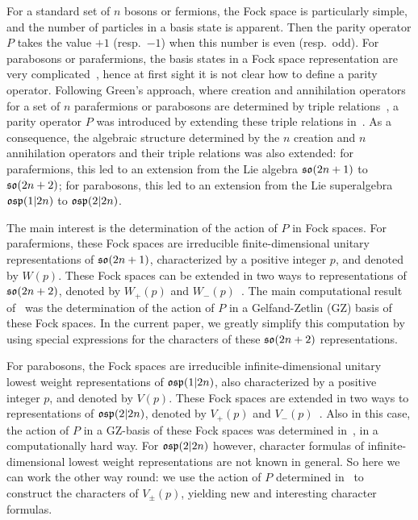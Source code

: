 \documentclass{SciPost}
\begin{document}
For a standard set of $n$ bosons or fermions, the Fock space is particularly simple, and the number of particles in a basis state is apparent. 
Then the parity operator $P$ takes the value $+1$ (resp.\ $-1$) when this number is even (resp.\ odd).
For parabosons or parafermions, the basis states in a Fock space representation are very complicated~\cite{parafermion,paraboson}, hence at first sight it is not clear how to define a parity operator.
Following Green's approach, where creation and annihilation operators for a set of $n$ parafermions or parabosons are determined by triple relations~\cite{Green},
a parity operator $P$ was introduced by extending these triple relations in~\cite{SV2026}.
As a consequence, the algebraic structure determined by the $n$ creation and $n$ annihilation operators and their triple relations was also extended: 
for parafermions, this led to an extension from the Lie algebra $\mathfrak{so}(2n+1)$ to $\mathfrak{so}(2n+2)$;
for parabosons, this led to an extension from the Lie superalgebra $\mathfrak{osp}(1|2n)$ to $\mathfrak{osp}(2|2n)$.

The main interest is the determination of the action of $P$ in Fock spaces.
For parafermions, these Fock spaces are irreducible finite-dimensional unitary representations of $\mathfrak{so}(2n+1)$, characterized by a positive integer $p$, and denoted by $W(p)$.
These Fock spaces can be extended in two ways to representations of $\mathfrak{so}(2n+2)$, denoted by $W_+(p)$ and $W_-(p)$~\cite{SV2026}.
The main computational result of~\cite{SV2026} was the determination of the action of $P$ in a Gelfand-Zetlin (GZ) basis of these Fock spaces. 
In the current paper, we greatly simplify this computation by using special expressions for the characters of these $\mathfrak{so}(2n+2)$ representations.

For parabosons, the Fock spaces are irreducible infinite-dimensional unitary lowest weight representations of $\mathfrak{osp}(1|2n)$, also characterized by a positive integer $p$, and denoted by $V(p)$.
These Fock spaces are extended in two ways to representations of $\mathfrak{osp}(2|2n)$, denoted by $V_+(p)$ and $V_-(p)$~\cite{SV2026}.
Also in this case, the action of $P$ in a GZ-basis of these Fock spaces was determined in~\cite{SV2026}, in a computationally hard way.
For $\mathfrak{osp}(2|2n)$ however, character formulas of infinite-dimensional lowest weight representations are not known in general.
So here we can work the other way round: we use the action of $P$ determined in~\cite{SV2026} to construct the characters of $V_{\pm}(p)$, yielding new and interesting character formulas.
\end{document}
